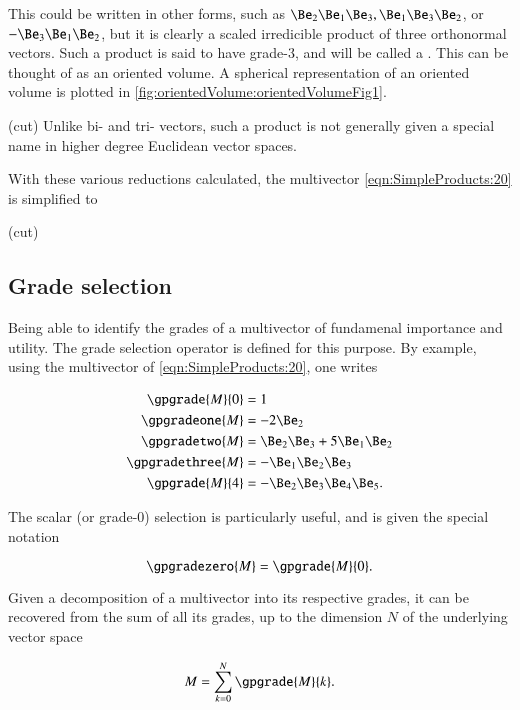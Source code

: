 This could be written in other forms, such as \( \Be_2 \Be_1 \Be_3, \Be_1 \Be_3 \Be_2 \), or \( -\Be_3 \Be_1 \Be_2 \), but it is clearly a scaled irredicible product of three orthonormal vectors.
Such a product is said to have grade-3, and will be called a .
This can be thought of as an oriented volume.
A spherical representation of an oriented volume is plotted in \cref{fig:orientedVolume:orientedVolumeFig1}.

(cut)
Unlike bi- and tri- vectors, such a product is not generally given a special name in higher degree Euclidean vector spaces.

With these various reductions calculated, the multivector \cref{eqn:SimpleProducts:20} is simplified to

(cut)

\subsection{Grade selection}

Being able to identify the grades of a multivector of fundamenal importance and utility.
The grade selection operator is defined for this purpose.
By example, using the multivector of \cref{eqn:SimpleProducts:20}, one writes

\begin{dmath}\label{eqn:SimpleProducts:140}
\begin{aligned}
   \gpgrade{M}{0} &= 1 \\
   \gpgradeone{M} &= - 2 \Be_2 \\
   \gpgradetwo{M} &= \Be_2 \Be_3 + 5 \Be_1 \Be_2 \\
   \gpgradethree{M} &= - \Be_1 \Be_2 \Be_3 \\
   \gpgrade{M}{4} &= -\Be_2 \Be_3 \Be_4 \Be_5.
\end{aligned}
\end{dmath}

The scalar (or grade-0) selection is particularly useful, and is given the special notation

\begin{dmath}\label{eqn:SimpleProducts:180}
\gpgradezero{M} = \gpgrade{M}{0}.
\end{dmath}

Given a decomposition of a multivector into its respective grades, it can be recovered from the sum of all its grades, up to the dimension \( N \) of the underlying vector space

\begin{dmath}\label{eqn:SimpleProducts:160}
   M = \sum_{k = 0}^N \gpgrade{M}{k}.
\end{dmath}
